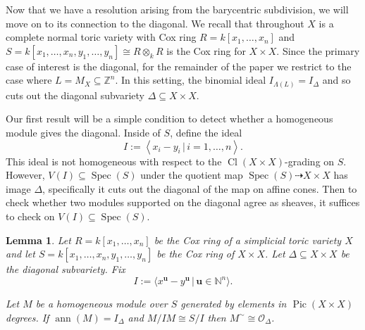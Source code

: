 \documentclass{amsart}
\newcommand{\cO}{\mathcal O}
\newcommand{\ZZ}{\mathbb{Z}}
\newcommand{\field}{k}
\DeclareMathOperator{\Pic}{Pic}
\DeclareMathOperator{\Cl}{Cl}
\DeclareMathOperator{\Spec}{Spec}
\newtheorem{lemma}[theorem]{Lemma}
\theoremstyle{remark}
\begin{document}
Now that we have a resolution arising from the barycentric subdivision, we will move on to its connection to the diagonal.
We recall that throughout $X$ is a complete normal toric variety with Cox ring $R=\field[x_1,\ldots,x_n]$ and $S=\field[x_1,\ldots,x_n,y_1,\ldots,y_n]\cong R\otimes_{\field} R$ is the Cox ring for $X\times X$.
Since the primary case of interest is the diagonal, for the remainder of the paper we restrict to the case where $L=M_X\subseteq \ZZ^n$. In this setting, the binomial ideal $I_{\Lambda(L)} = I_{\Delta}$ and so cuts out the diagonal subvariety $\Delta\subseteq X\times X$.

Our first result will be a simple condition to detect whether a homogeneous module gives the diagonal. Inside of $S$, define the ideal
\[I:= \left<x_i-y_i \,|\, i=1,\ldots,n \right>.\]
This ideal is not homogeneous with respect to the $\Cl(X\times X)$-grading on $S$.
However, $V(I)\subseteq \Spec(S)$ under the quotient map $\Spec(S)\dashrightarrow X\times X$ has image $\Delta$, specifically it cuts out the diagonal of the map on affine cones. Then to check whether two modules supported on the diagonal agree as sheaves, it suffices to check on $V(I)\subseteq \Spec(S)$.
\begin{lemma}
  \label{lem:homogenize-diagonal}
  Let $R=\field[x_1,\ldots,x_n]$ be the Cox ring of a simplicial toric variety $X$ and let $S=\field[x_1,\ldots,x_n,y_1,\ldots,y_n]$ be the Cox ring of $X\times X$. Let $\Delta\subseteq X\times X$ be the diagonal subvariety. Fix \[I:=\langle x^{\bm{u}}-y^{\bm{u}} \,|\, \bm{u}\in \mathbb{N}^n\rangle.\]
  
  Let $M$ be a homogeneous module over $S$ generated by elements in $\Pic(X\times X)$ degrees. If $\operatorname{ann}(M)=I_\Delta$ and $M/IM \cong S/I$ then $M^{\sim}\cong \cO_{\Delta}$.
\end{lemma}
\end{document}
